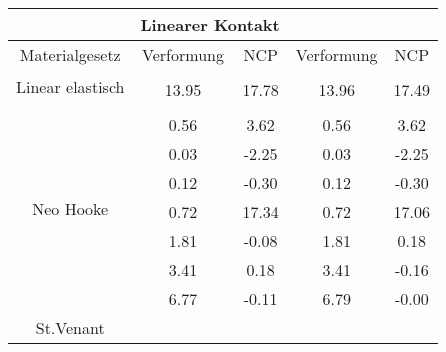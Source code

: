 \begin{table} 
\centering 
\begin{tabular}{c|cc|cc|} 
\cline{2-5} 
 & \multicolumn{2}{|c|}{Linearer Kontakt} &  \\ 
\hline 
\multicolumn{1}{|c|}{Materialgesetz} & \multicolumn{1}{c|}{Verformung} & \multicolumn{1}{c|}{NCP} & \multicolumn{1}{c|}{Verformung} & \multicolumn{1}{c|}{NCP} \\ 
\hline 
\multicolumn{1}{|c|}{\multirow{2}{*}{Linear elastisch}} &\multicolumn{1}{|c|}{} & \multicolumn{1}{|c|}{} & \multicolumn{1}{|c|}{} & \multicolumn{1}{|c|}{} \\ 
\multicolumn{1}{|c|}{} & \multicolumn{1}{|c|}{     13.95} & \multicolumn{1}{|c|}{     17.78} & \multicolumn{1}{|c|}{     13.96} & \multicolumn{1}{|c|}{     17.49} \\ 
\hline 
\multicolumn{1}{|c|}{\multirow{8}{*}{Neo Hooke}} &\multicolumn{1}{|c|}{} & \multicolumn{1}{|c|}{} & \multicolumn{1}{|c|}{} & \multicolumn{1}{|c|}{} \\ 
\multicolumn{1}{|c|}{} & \multicolumn{1}{|c|}{      0.56} & \multicolumn{1}{|c|}{      3.62} & \multicolumn{1}{|c|}{      0.56} & \multicolumn{1}{|c|}{      3.62} \\ 
\multicolumn{1}{|c|}{} & \multicolumn{1}{|c|}{      0.03} & \multicolumn{1}{|c|}{     -2.25} & \multicolumn{1}{|c|}{      0.03} & \multicolumn{1}{|c|}{     -2.25} \\ 
\multicolumn{1}{|c|}{} & \multicolumn{1}{|c|}{      0.12} & \multicolumn{1}{|c|}{     -0.30} & \multicolumn{1}{|c|}{      0.12} & \multicolumn{1}{|c|}{     -0.30} \\ 
\multicolumn{1}{|c|}{} & \multicolumn{1}{|c|}{      0.72} & \multicolumn{1}{|c|}{     17.34} & \multicolumn{1}{|c|}{      0.72} & \multicolumn{1}{|c|}{     17.06} \\ 
\multicolumn{1}{|c|}{} & \multicolumn{1}{|c|}{      1.81} & \multicolumn{1}{|c|}{     -0.08} & \multicolumn{1}{|c|}{      1.81} & \multicolumn{1}{|c|}{      0.18} \\ 
\multicolumn{1}{|c|}{} & \multicolumn{1}{|c|}{      3.41} & \multicolumn{1}{|c|}{      0.18} & \multicolumn{1}{|c|}{      3.41} & \multicolumn{1}{|c|}{     -0.16} \\ 
\multicolumn{1}{|c|}{} & \multicolumn{1}{|c|}{      6.77} & \multicolumn{1}{|c|}{     -0.11} & \multicolumn{1}{|c|}{      6.79} & \multicolumn{1}{|c|}{     -0.00} \\ 
\hline 
\multicolumn{1}{|c|}{\multirow{101}{*}{St.Venant}} &\multicolumn{1}{|c|}{} & \multicolumn{1}{|c|}{} & \multicolumn{1}{|c|}{} & \multicolumn{1}{|c|}{} \\ 

\end{tabular}
\end{table}
